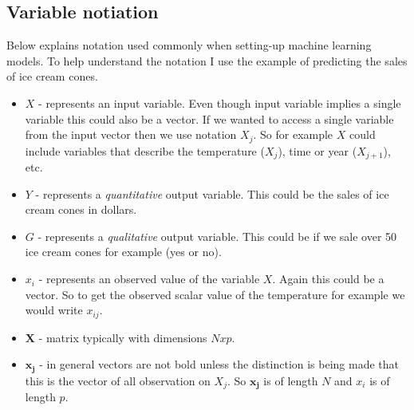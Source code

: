 \documentclass[paper=a4, fontsize=11pt]{scrartcl} %
\numberwithin{equation}{section} %
\numberwithin{figure}{section} %
\numberwithin{table}{section} %
\begin{document}
\subsection{Variable notiation}

Below explains notation used commonly when setting-up machine learning models. To help understand the notation I use the example of predicting the sales of ice cream cones.
\vspace{2mm}

\begin{itemize}
\item $X$ - represents an input variable. Even though input variable implies a single variable this could also be a vector. If we wanted to access a single variable from the input vector then we use notation $X_j$. So for example $X$ could include variables that describe the temperature ($X_{j}$), time or year ($X_{j+1}$), etc. 
\item $Y$ - represents a \emph{quantitative} output variable. This could be the sales of ice cream cones in dollars.
\item $G$ - represents a \emph{qualitative} output variable. This could be if we sale over 50 ice cream cones for example (yes or no). 
\item $x_i$ - represents an observed value of the variable $X$. Again this could be a vector. So to get the observed scalar value of the temperature for example we would write $x_{ij}$. 
\item $\bm{X}$ - matrix typically with dimensions $Nxp$. 
\item $\bm{x_j}$ -  in general vectors are not bold unless the distinction is being made that this is the vector of all observation on $X_j$. So $\bm{x_j}$ is of length $N$ and $x_i$ is of length $p$.
\end{itemize}





\clearpage
\printglossaries
\end{document}
